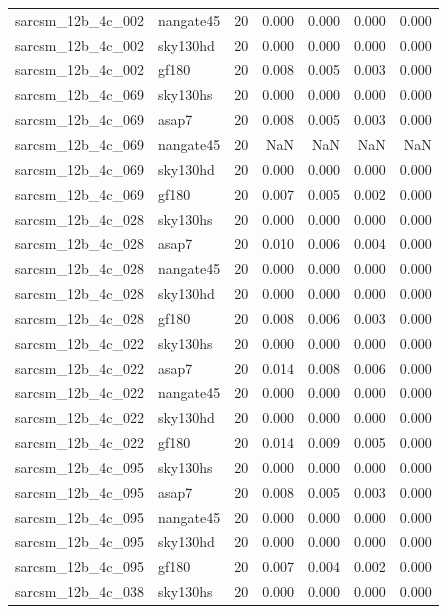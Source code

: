 \begin{tabular}{llrrrrr}
sarcsm\_12b\_4c\_002 & nangate45 & 20 & 0.000 & 0.000 & 0.000 & 0.000 \\
sarcsm\_12b\_4c\_002 & sky130hd & 20 & 0.000 & 0.000 & 0.000 & 0.000 \\
sarcsm\_12b\_4c\_002 & gf180 & 20 & 0.008 & 0.005 & 0.003 & 0.000 \\
sarcsm\_12b\_4c\_069 & sky130hs & 20 & 0.000 & 0.000 & 0.000 & 0.000 \\
sarcsm\_12b\_4c\_069 & asap7 & 20 & 0.008 & 0.005 & 0.003 & 0.000 \\
sarcsm\_12b\_4c\_069 & nangate45 & 20 & NaN & NaN & NaN & NaN \\
sarcsm\_12b\_4c\_069 & sky130hd & 20 & 0.000 & 0.000 & 0.000 & 0.000 \\
sarcsm\_12b\_4c\_069 & gf180 & 20 & 0.007 & 0.005 & 0.002 & 0.000 \\
sarcsm\_12b\_4c\_028 & sky130hs & 20 & 0.000 & 0.000 & 0.000 & 0.000 \\
sarcsm\_12b\_4c\_028 & asap7 & 20 & 0.010 & 0.006 & 0.004 & 0.000 \\
sarcsm\_12b\_4c\_028 & nangate45 & 20 & 0.000 & 0.000 & 0.000 & 0.000 \\
sarcsm\_12b\_4c\_028 & sky130hd & 20 & 0.000 & 0.000 & 0.000 & 0.000 \\
sarcsm\_12b\_4c\_028 & gf180 & 20 & 0.008 & 0.006 & 0.003 & 0.000 \\
sarcsm\_12b\_4c\_022 & sky130hs & 20 & 0.000 & 0.000 & 0.000 & 0.000 \\
sarcsm\_12b\_4c\_022 & asap7 & 20 & 0.014 & 0.008 & 0.006 & 0.000 \\
sarcsm\_12b\_4c\_022 & nangate45 & 20 & 0.000 & 0.000 & 0.000 & 0.000 \\
sarcsm\_12b\_4c\_022 & sky130hd & 20 & 0.000 & 0.000 & 0.000 & 0.000 \\
sarcsm\_12b\_4c\_022 & gf180 & 20 & 0.014 & 0.009 & 0.005 & 0.000 \\
sarcsm\_12b\_4c\_095 & sky130hs & 20 & 0.000 & 0.000 & 0.000 & 0.000 \\
sarcsm\_12b\_4c\_095 & asap7 & 20 & 0.008 & 0.005 & 0.003 & 0.000 \\
sarcsm\_12b\_4c\_095 & nangate45 & 20 & 0.000 & 0.000 & 0.000 & 0.000 \\
sarcsm\_12b\_4c\_095 & sky130hd & 20 & 0.000 & 0.000 & 0.000 & 0.000 \\
sarcsm\_12b\_4c\_095 & gf180 & 20 & 0.007 & 0.004 & 0.002 & 0.000 \\
sarcsm\_12b\_4c\_038 & sky130hs & 20 & 0.000 & 0.000 & 0.000 & 0.000 \\

\end{tabular}
